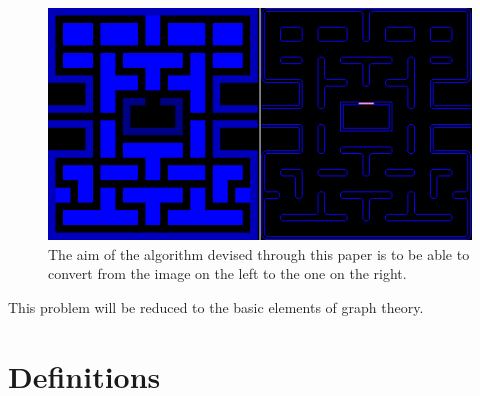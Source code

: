 \documentclass[a4paper,12pt]{article}
\begin{document}
\begin{figure}[H]
\centering
\includegraphics[width=0.8\linewidth]{Image-5.png}
\caption {The aim of the algorithm devised through this paper is to be able to convert from the image on the left to the one on the right.}\label{LevelWallConversion}
\end{figure}

This problem will be reduced to the basic elements of graph theory.

\section{Definitions}
\end{document}
